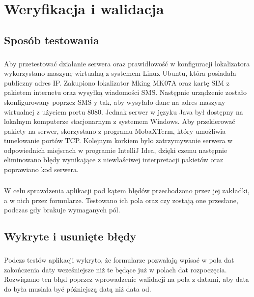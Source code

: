 \chapter{Weryfikacja i walidacja}
\label{ch:06}

\section{Sposób testowania}
\paragraph{}
Aby przetestować działanie serwera oraz prawidłowość w konfiguracji lokalizatora wykorzystano maszynę wirtualną z systemem Linux Ubuntu, która posiadała publiczny adres IP. Zakupiono lokalizator Mking MK07A oraz kartę SIM z pakietem internetu oraz wysyłką wiadomości SMS. Następnie urządzenie zostało skonfigurowany poprzez SMS-y tak, aby wysyłało dane na adres maszyny wirtualnej z użyciem portu 8080. Jednak serwer w języku Java był dostępny na lokalnym komputerze stacjonarnym z systemem Windows. Aby przekierować pakiety na serwer, skorzystano z programu MobaXTerm, który umożliwia tunelowanie portów TCP. Kolejnym korkiem było zatrzymywanie serwera w odpowiednich miejscach w programie IntelliJ Idea, dzięki czemu następnie eliminowano błędy wynikające z niewłaściwej interpretacji pakietów oraz poprawiano kod serwera.

\paragraph{}
W celu sprawdzenia aplikacji pod kątem błędów przechodzono przez jej zakładki, a w nich przez formularze. Testowano ich pola oraz czy zostają one przesłane, podczas gdy brakuje wymaganych pól.

\section{Wykryte i usunięte błędy}
\paragraph{}
Podczs testów aplikacji wykryto, że formularze pozwalają wpisać w pola dat zakończenia daty wcześniejsze niż te będące już w polach dat rozpoczęcia. Rozwiązano ten błąd poprzez wprowadzenie walidacji na pola z datami, aby data do była musiala być późniejszą datą niż data od.

